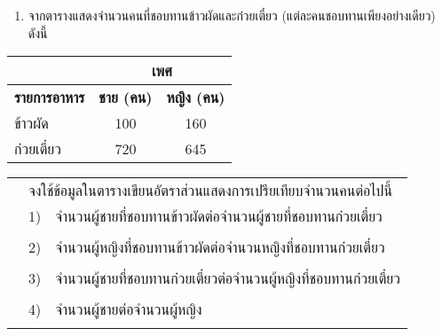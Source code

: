 \documentclass[
  a4paper,
  DIV=11,
  numbers=noendperiod]{scrartcl}
\providecommand{\tightlist}{%
  \setlength{\itemsep}{0pt}\setlength{\parskip}{0pt}}
\begin{document}
\newpage

\begin{enumerate}
\def\labelenumi{\arabic{enumi}.}
\setcounter{enumi}{2}
\tightlist
\item
  จากตารางแสดงจำนวนคนที่ชอบทานข้าวผัดและก๋วยเตี๋ยว (แต่ละคนชอบทานเพียงอย่างเดียว)
  ดังนี้
\end{enumerate}

\centering

\begin{tabular}[c]{l|cc|}
\cline{2-3}
                                 & \multicolumn{2}{c|}{\textbf{เพศ}} \\ \hline
\multicolumn{1}{|l|}{\textbf{รายการอาหาร}} & \multicolumn{1}{c|}{\textbf{ชาย (คน)}} & \textbf{หญิง (คน)} \\ \hline
\multicolumn{1}{|l|}{ข้าวผัด}    & \multicolumn{1}{c|}{100}   & 160  \\ \hline
\multicolumn{1}{|l|}{ก๋วยเตี๋ยว} & \multicolumn{1}{c|}{720}   & 645  \\ \hline
\end{tabular}

\flushleft

\begin{tabular}{p{0.5cm}lp{13cm}}

& \multicolumn{2}{l}{จงใช้ข้อมูลในตารางเขียนอัตราส่วนแสดงการเปรียเทียบจำนวนคนต่อไปนี้} \\

& 1) & จำนวนผู้ชายที่ชอบทานข้าวผัดต่อจำนวนผู้ชายที่ชอบทานก๋วยเตี๋ยว \\

&    &  \dotfill \\

& 2) & จำนวนผู้หญิงที่ชอบทานข้าวผัดต่อจำนวนหญิงที่ชอบทานก๋วยเตี๋ยว \\

&    &  \dotfill \\

& 3) & จำนวนผู้ชายที่ชอบทานก๋วยเตี๋ยวต่อจำนวนผู้หญิงที่ชอบทานก๋วยเตี๋ยว \\

&    &  \dotfill \\

& 4) & จำนวนผู้ชายต่อจำนวนผู้หญิง \\

&    &  \dotfill \\



\end{tabular}
\end{document}
